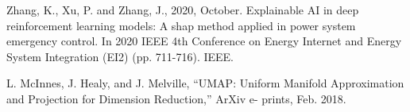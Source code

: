 \documentclass[10pt, conference, a4paper, final]{IEEEtran}
\begin{document}
\begin{thebibliography}{01}
Zhang, K., Xu, P. and Zhang, J., 2020, October. Explainable AI in deep reinforcement learning models: A shap method applied in power system emergency control. In 2020 IEEE 4th Conference on Energy Internet and Energy System Integration (EI2) (pp. 711-716). IEEE.






	L. McInnes, J. Healy, and J. Melville, “UMAP: Uniform Manifold Approximation and Projection for Dimension Reduction,” ArXiv e- prints, Feb. 2018.
  
 
\end{thebibliography}
\appendix

\renewcommand{\thesection}{Appendix \Alph{section}}

\end{document}
